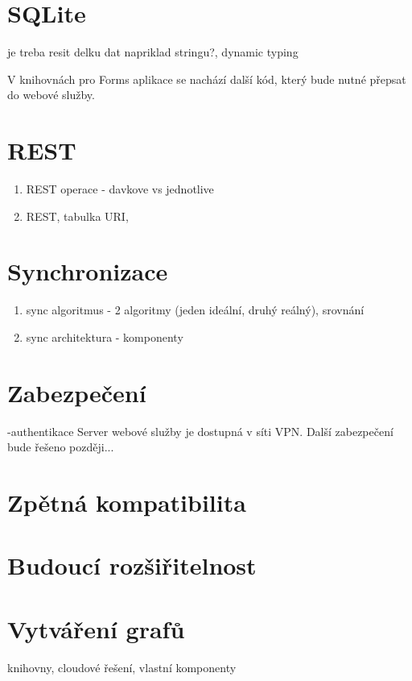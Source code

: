 \documentclass{bakalarka}
\begin{document}
\section{SQLite}
je treba resit delku dat napriklad stringu?, dynamic typing

V knihovnách pro Forms aplikace se nachází další kód, který bude nutné přepsat do webové služby.
\section{REST}
\begin{enumerate}
\item REST operace - davkove vs jednotlive
\item REST, tabulka URI, 
\end{enumerate}

\section{Synchronizace}
\begin{enumerate}
\item sync algoritmus - 2 algoritmy (jeden ideální, druhý reálný), srovnání
\item sync architektura - komponenty
\end{enumerate}

\section{Zabezpečení}
-authentikace
Server webové služby je dostupná v síti VPN. Další zabezpečení bude řešeno později...

\section{Zpětná kompatibilita}

\section{Budoucí rozšiřitelnost}

\section{Vytváření grafů}
knihovny, cloudové řešení, vlastní komponenty
\end{document}
